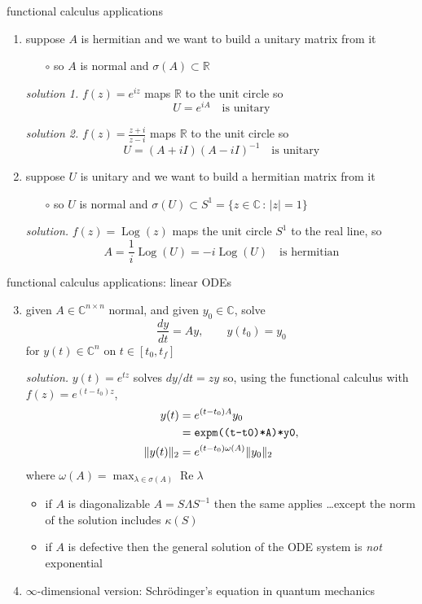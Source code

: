 \documentclass[10pt,hyperref]{beamer}
\newcommand{\CC}{\mathbb{C}}
\newcommand{\RR}{\mathbb{R}}
\begin{document}
\begin{frame}{functional calculus applications}

\begin{enumerate}
\item suppose $A$ is hermitian and we want to build a unitary matrix from it
    \begin{itemize}
    \item[$\circ$] so $A$ is normal and $\sigma(A) \subset \RR$
    \end{itemize}

\medskip
\emph{solution 1.} $f(z) = e^{iz}$ maps $\RR$ to the unit circle so
    $$U = e^{iA} \quad \text{is unitary}$$

\emph{solution 2.} $\displaystyle f(z) = \frac{z+i}{z-i}$ maps $\RR$ to the unit circle so
    $$U = (A+iI)(A-iI)^{-1} \quad \text{is unitary}$$

\medskip
\item suppose $U$ is unitary and we want to build a hermitian matrix from it
    \begin{itemize}
    \item[$\circ$] so $U$ is normal and $\sigma(U) \subset S^1 = \{z\in \CC\,:\, |z|=1\}$
    \end{itemize}
\newcommand{\Log}{\operatorname{Log}}

\medskip
\emph{solution.} $f(z) = \Log(z)$ maps the unit circle $S^1$ to the real line, so
    $$A = \frac{1}{i} \Log(U) = -i \Log(U) \quad \text{is hermitian}$$
\end{enumerate}
\end{frame}


\begin{frame}{functional calculus applications: linear ODEs}

\begin{enumerate}
\setcounter{enumi}{2}
\item given $A \in \CC^{n\times n}$ normal, and given $y_0\in\CC$, solve
    $$\frac{dy}{dt} = A y, \qquad y(t_0) = y_0$$
for $y(t) \in \CC^n$ on $t\in [t_0,t_f]$ 

\medskip
\emph{solution.} $y(t) = e^{tz}$ solves $dy/dt=zy$ so, using the functional calculus with $f(z) = e^{(t-t_0)z}$,
\begin{align*}
    y(t) &= e^{(t-t_0)A} y_0 \\
         &= \text{\texttt{expm((t-t0)*A)*y0}}, \\
  \|y(t)\|_2 &= e^{(t-t_0)\omega(A)}\|y_0\|_2
\end{align*}
where $\omega(A) = \max_{\lambda\in\sigma(A)} \operatorname{Re} \lambda$
\begin{itemize}
\item if $A$ is diagonalizable $A=S \Lambda S^{-1}$ then the same applies \dots except the norm of the solution includes $\kappa(S)$
\item if $A$ is defective then the general solution of the ODE system is \emph{not} exponential
\end{itemize}
\item $\infty$-dimensional version: Schr\"odinger's equation in quantum mechanics
\end{enumerate}
\end{frame}
\end{document}
